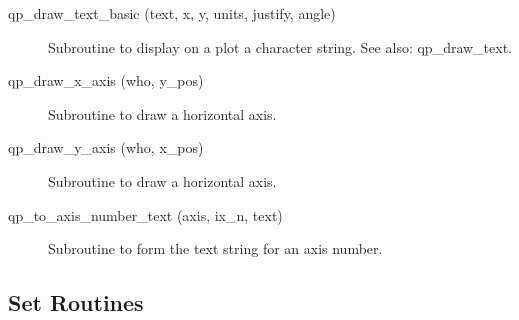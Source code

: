 \begin{description}
\item[qp_draw_text_basic (text, x, y, units, justify, angle)] \Newline 
     Subroutine to display on a plot a character string.
     See also: qp_draw_text.

\item[qp_draw_x_axis (who, y_pos)] \Newline 
     Subroutine to draw a horizontal axis.

\item[qp_draw_y_axis (who, x_pos)] \Newline 
     Subroutine to draw a horizontal axis.

\item[qp_to_axis_number_text (axis, ix_n, text)] \Newline 
     Subroutine to form the text string for an axis number.

\end{description}

\subsection{Set Routines}

